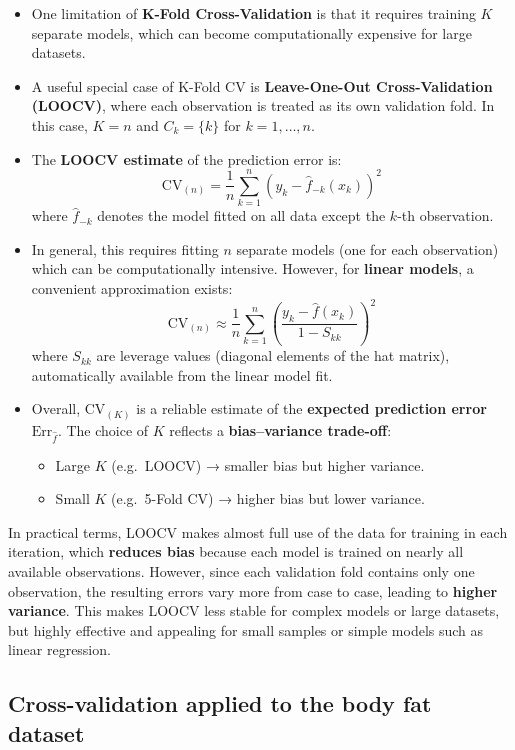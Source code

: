 \documentclass[
  letterpaper,
  DIV=11,
  numbers=noendperiod]{scrartcl}
\providecommand{\tightlist}{%
  \setlength{\itemsep}{0pt}\setlength{\parskip}{0pt}}\usepackage{longtable,booktabs,array}
\begin{document}
\begin{itemize}
\item
  One limitation of \textbf{K-Fold Cross-Validation} is that it requires
  training \(K\) separate models, which can become computationally
  expensive for large datasets.
\item
  A useful special case of K-Fold CV is \textbf{Leave-One-Out
  Cross-Validation (LOOCV)}, where each observation is treated as its
  own validation fold. In this case, \(K = n\) and \(C_k = \{k\}\) for
  \(k = 1, \dots, n\).
\item
  The \textbf{LOOCV estimate} of the prediction error is:
  \[\text{CV}_{(n)} = \frac{1}{n} \sum_{k=1}^{n} (y_k - \hat{f}_{-k}(x_k))^2\]
  where \(\hat{f}_{-k}\) denotes the model fitted on all data except the
  \(k\)-th observation.
\item
  In general, this requires fitting \(n\) separate models (one for each
  observation) which can be computationally intensive. However, for
  \textbf{linear models}, a convenient approximation exists:
  \[ \text{CV}_{(n)} \approx \frac{1}{n} \sum_{k=1}^{n} \left( \frac{y_k - \hat{f}(x_k)}{1 - S_{kk}} \right)^2\]
  where \(S_{kk}\) are leverage values (diagonal elements of the hat
  matrix), automatically available from the linear model fit.
\item
  Overall, \(\text{CV}_{(K)}\) is a reliable estimate of the
  \textbf{expected prediction error} \(\text{Err}_{\hat{f}}\). The
  choice of \(K\) reflects a \textbf{bias--variance trade-off}:

  \begin{itemize}
  \tightlist
  \item
    Large \(K\) (e.g.~LOOCV) → smaller bias but higher variance.
  \item
    Small \(K\) (e.g.~5-Fold CV) → higher bias but lower variance.
  \end{itemize}
\end{itemize}

In practical terms, LOOCV makes almost full use of the data for training
in each iteration, which \textbf{reduces bias} because each model is
trained on nearly all available observations. However, since each
validation fold contains only one observation, the resulting errors vary
more from case to case, leading to \textbf{higher variance}. This makes
LOOCV less stable for complex models or large datasets, but highly
effective and appealing for small samples or simple models such as
linear regression.

\subsection{Cross-validation applied to the body fat
dataset}\label{cross-validation-applied-to-the-body-fat-dataset}
\end{document}
